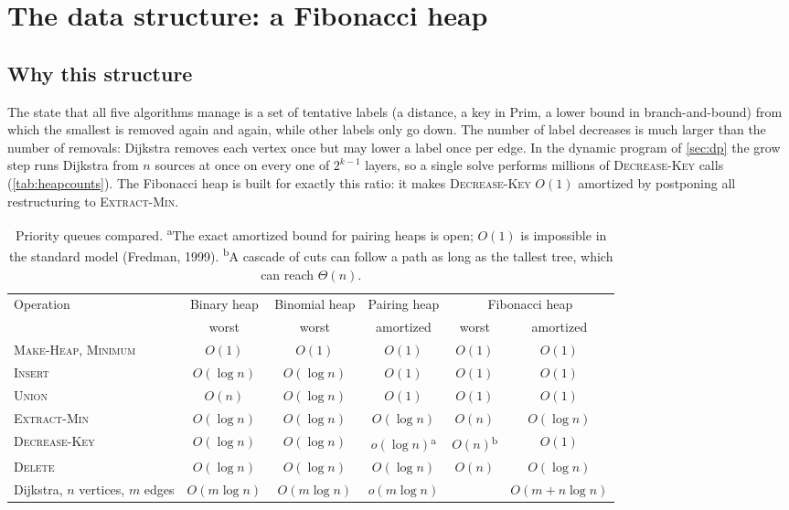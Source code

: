 \section{The data structure: a Fibonacci heap}\label{sec:heap}

\subsection{Why this structure}
The state that all five algorithms manage is a set of tentative labels (a distance, a key in Prim, a lower bound
in branch-and-bound) from which the smallest is removed again and again, while other labels only go down. The
number of label decreases is much larger than the number of removals: Dijkstra removes each vertex once but may
lower a label once per edge. In the dynamic program of \cref{sec:dp} the grow step runs Dijkstra from
\(n\) sources at once on every one of \(2^{k-1}\) layers, so a single solve performs millions of
\textsc{Decrease-Key} calls (\cref{tab:heapcounts}). The Fibonacci heap is built for exactly this ratio: it makes
\textsc{Decrease-Key} \(O(1)\) amortized by postponing all restructuring to \textsc{Extract-Min}.

\begin{table}[!htbp]\centering\small
\begin{tabular}{@{}lccccc@{}}\toprule
Operation & Binary heap & Binomial heap & Pairing heap & \multicolumn{2}{c}{Fibonacci heap}\\
 & worst & worst & amortized & worst & amortized\\\midrule
\textsc{Make-Heap}, \textsc{Minimum} & \(O(1)\) & \(O(1)\) & \(O(1)\) & \(O(1)\) & \(O(1)\)\\
\textsc{Insert} & \(O(\log n)\) & \(O(\log n)\) & \(O(1)\) & \(O(1)\) & \(O(1)\)\\
\textsc{Union} & \(O(n)\) & \(O(\log n)\) & \(O(1)\) & \(O(1)\) & \(O(1)\)\\
\textsc{Extract-Min} & \(O(\log n)\) & \(O(\log n)\) & \(O(\log n)\) & \(O(n)\) & \(O(\log n)\)\\
\textsc{Decrease-Key} & \(O(\log n)\) & \(O(\log n)\) & \(o(\log n)\)\textsuperscript{a} & \(O(n)\)\textsuperscript{b} & \(O(1)\)\\
\textsc{Delete} & \(O(\log n)\) & \(O(\log n)\) & \(O(\log n)\) & \(O(n)\) & \(O(\log n)\)\\\midrule
Dijkstra, \(n\) vertices, \(m\) edges & \(O(m\log n)\) & \(O(m\log n)\) & \(o(m\log n)\) & & \(O(m+n\log n)\)\\\bottomrule
\end{tabular}
\caption{Priority queues compared. \textsuperscript{a}The exact amortized bound for pairing heaps is open;
\(O(1)\) is impossible in the standard model (Fredman, 1999). \textsuperscript{b}A cascade of cuts can follow a path
as long as the tallest tree, which can reach \(\Theta(n)\).}\label{tab:pq}
\end{table}

